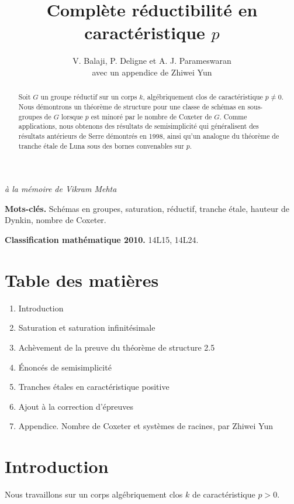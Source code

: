 \documentclass[11pt]{article}
\title{Complète réductibilité en caractéristique \(p\)}
\author{V. Balaji, P. Deligne et A. J. Parameswaran\\
\large avec un appendice de Zhiwei Yun}
\date{}
\begin{document}
\maketitle

\begin{center}
\emph{à la mémoire de Vikram Mehta}
\end{center}

\begin{abstract}
Soit \(G\) un groupe réductif sur un corps \(k\), algébriquement clos de caractéristique
\(p\ne 0\). Nous démontrons un théorème de structure pour une classe de schémas en
sous-groupes de \(G\) lorsque \(p\) est minoré par le nombre de Coxeter de \(G\). Comme
applications, nous obtenons des résultats de semisimplicité qui généralisent des résultats
antérieurs de Serre démontrés en 1998, ainsi qu'un analogue du théorème de tranche étale
de Luna sous des bornes convenables sur \(p\).
\end{abstract}

\noindent\textbf{Mots-clés.} Schémas en groupes, saturation, réductif, tranche étale, hauteur de Dynkin, nombre de Coxeter.

\noindent\textbf{Classification mathématique 2010.} 14L15, 14L24.

\section*{Table des matières}
\begin{enumerate}[leftmargin=2em,label=\arabic*.]
\item Introduction
\item Saturation et saturation infinitésimale
\item Achèvement de la preuve du théorème de structure 2.5
\item Énoncés de semisimplicité
\item Tranches étales en caractéristique positive
\item Ajout à la correction d'épreuves
\item Appendice. Nombre de Coxeter et systèmes de racines, par Zhiwei Yun
\end{enumerate}

\section{Introduction}

Nous travaillons sur un corps algébriquement clos \(k\) de caractéristique \(p>0\).
\end{document}

